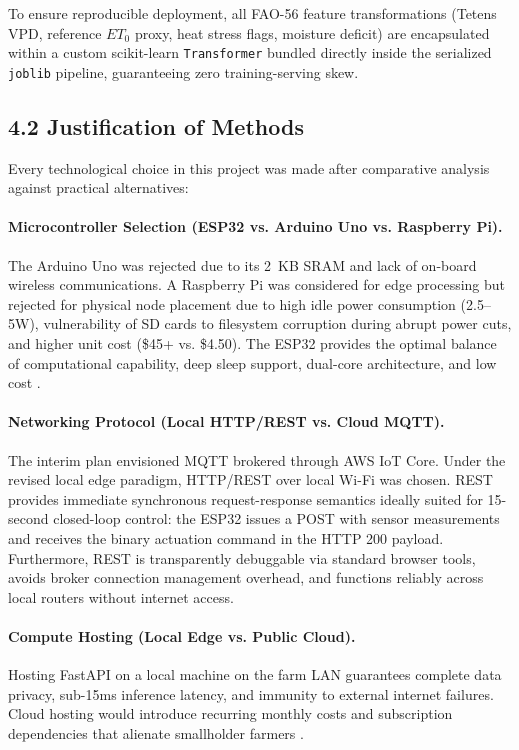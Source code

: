\documentclass[12pt, a4paper]{article}
\begin{document}
To ensure reproducible deployment, all FAO-56 feature transformations (Tetens VPD, reference $ET_0$ proxy, heat stress flags, moisture deficit) are encapsulated within a custom scikit-learn \texttt{Transformer} bundled directly inside the serialized \texttt{joblib} pipeline, guaranteeing zero training-serving skew.

\subsection{4.2 Justification of Methods}
\label{sec:methods-justification}

Every technological choice in this project was made after comparative analysis against practical alternatives:

\paragraph{Microcontroller Selection (ESP32 vs. Arduino Uno vs. Raspberry Pi).} The Arduino Uno was rejected due to its 2~KB SRAM and lack of on-board wireless communications. A Raspberry Pi was considered for edge processing but rejected for physical node placement due to high idle power consumption (2.5--5W), vulnerability of SD cards to filesystem corruption during abrupt power cuts, and higher unit cost (\$45+ vs. \$4.50). The ESP32 provides the optimal balance of computational capability, deep sleep support, dual-core architecture, and low cost \citep{rajpoot2022}.

\paragraph{Networking Protocol (Local HTTP/REST vs. Cloud MQTT).} The interim plan envisioned MQTT brokered through AWS IoT Core. Under the revised local edge paradigm, HTTP/REST over local Wi-Fi was chosen. REST provides immediate synchronous request-response semantics ideally suited for 15-second closed-loop control: the ESP32 issues a POST with sensor measurements and receives the binary actuation command in the HTTP 200 payload. Furthermore, REST is transparently debuggable via standard browser tools, avoids broker connection management overhead, and functions reliably across local routers without internet access.

\paragraph{Compute Hosting (Local Edge vs. Public Cloud).} Hosting FastAPI on a local machine on the farm LAN guarantees complete data privacy, sub-15ms inference latency, and immunity to external internet failures. Cloud hosting would introduce recurring monthly costs and subscription dependencies that alienate smallholder farmers \citep{zitan2021}.
\end{document}
